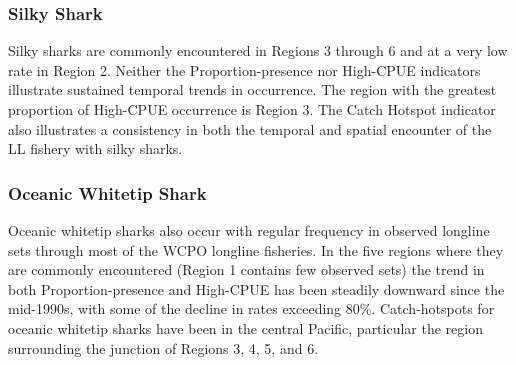 \documentclass[12pt]{SCreport}
\begin{document}
          
 \subsubsection{Silky Shark}
 Silky sharks are commonly encountered in Regions 3 through 6 and at a very low rate in Region 2.  Neither the Proportion-presence nor High-CPUE indicators illustrate sustained temporal trends in occurrence.  The region with the greatest proportion of High-CPUE occurrence is Region 3.  The Catch Hotspot indicator also illustrates a consistency in both the temporal and spatial encounter of the LL fishery with silky sharks.
 \subsubsection{Oceanic Whitetip Shark}
 Oceanic whitetip sharks also occur with regular frequency in observed longline sets through most of the WCPO longline fisheries.  In the five regions where they are commonly encountered (Region 1 contains few observed sets) the trend in both Proportion-presence and High-CPUE has been steadily downward since the mid-1990s, with some of the decline in rates exceeding 80\%.  Catch-hotspots for oceanic whitetip sharks have been in the central Pacific, particular the region surrounding the junction of Regions 3, 4, 5, and 6.
\end{document}

